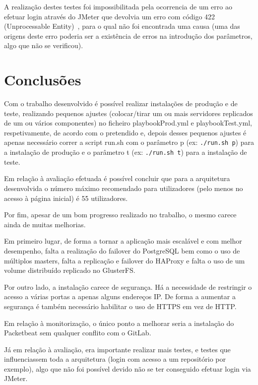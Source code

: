 \documentclass{article}
\begin{document}
A realização destes testes foi impossibilitada pela ocorrencia de um erro ao efetuar login através do JMeter que devolvia um erro com código 422 (Unprocessable Entity)~\cite{er422}, para o qual não foi encontrada uma causa (uma das origens deste erro poderia ser a existência de erros na introdução dos parâmetros, algo que não se verificou).

\newpage

\section{Conclusões} \label{Conc}

\par Com o trabalho desenvolvido é possível realizar instalações de produção e de teste, realizando pequenos ajustes (colocar/tirar um ou mais servidores replicados de um ou vários componentes) no ficheiro playbookProd.yml e playbookTest.yml, respetivamente, de acordo com o pretendido e, depois desses pequenos ajustes é apenas necessário correr a script run.sh com o parâmetro p (ex: \verb|./run.sh p|) para a instalação de produção e o parâmetro t (ex: \verb|./run.sh t|) para a instalação de teste.
\par Em relação à avaliação efetuada é possível concluir que para a arquitetura desenvolvida o número máximo recomendado para utilizadores (pelo menos no acesso à página inicial) é 55 utilizadores.
\par Por fim, apesar de um bom progresso realizado no trabalho, o mesmo carece ainda de muitas melhorias.
\par Em primeiro lugar, de forma a tornar a aplicação mais escalável e com melhor desempenho, falta a realização do failover do PostgreSQL bem como o uso de múltiplos masters, falta a replicação e failover do HAProxy e falta o uso de um volume distribuído replicado no GlusterFS.
\par Por outro lado, a instalação carece de segurança. Há a necessidade de restringir o acesso a várias portas a apenas alguns endereços IP. De forma a aumentar a segurança é também necessário habilitar o uso de HTTPS em vez de HTTP. 
\par Em relação à monitorização, o único ponto a melhorar seria a instalação do Packetbeat sem qualquer conflito com o GitLab. 
\par Já em relação à avaliação, era importante realizar mais testes, e testes que influenciassem toda a arquitetura (login com acesso a um repositório por exemplo), algo que não foi possível devido não se ter conseguido efetuar login via JMeter.

\newpage

\printbibliography
\end{document}
